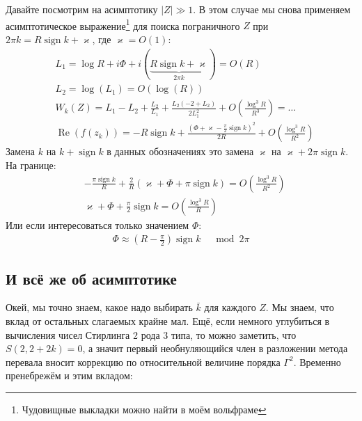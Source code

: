 \documentclass[a4paper, 12pt]{article}
\DeclareMathOperator*{\sign}{sign}
\DeclareMathOperator*{\Real}{Re}
\begin{document}
Давайте посмотрим на асимптотику $|Z|\gg 1$. В этом случае мы снова применяем асимптотическое выражение\footnote{Чудовищные выкладки можно найти в моём вольфраме} для поиска пограничного $Z$ при $2\pi k= R\sign k + \varkappa$, где $\varkappa = O(1)$:
\begin{equation}
\begin{aligned}
    &L_1 = \log R + i \Phi + i\left(\underbrace{R\sign k + \varkappa}_{2\pi k}\right) = O(R)\\
    &L_2 = \log(L_1) = O(\log(R))\\
    &W_k(Z) = L_1 - L_2 + \frac{L_2}{L_1} + \frac{L_2(-2+L_2)}{2L_1^2} + O\left(\frac{\log^3 R}{R^3}\right) = \dots\\
    &\Real(f(z_k)) =  -R\sign k + \frac{\left(\Phi + \varkappa - \frac{\pi}{2}\sign k\right)^2}{2R} +
     O\left(\frac{\log^3 R}{R^2}\right)
\end{aligned}
\end{equation}
Замена $k$ на $k+\sign k$ в данных обозначениях это замена $\varkappa$ на $\varkappa + 2\pi\sign k$. На границе:
\begin{equation}
\begin{aligned}
    &-\frac{\pi\sign k}{R} + \frac{2}{R}
    \left(\varkappa + \Phi + \pi\sign k\right) = O\left(\frac{\log^3 R}{R^2}\right)\\
    &\varkappa + \Phi + \frac{\pi}{2}\sign k= O\left(\frac{\log^3 R}{R}\right)
\end{aligned}
\end{equation}
Или если интересоваться только значением $\Phi$:
\begin{equation}
\begin{aligned}
    \Phi \approx \left(R-\frac{\pi}{2}\right)\sign k \;\;\; \mod 2\pi
\end{aligned}
\end{equation}

\subsection*{И всё же об асимптотике}

Окей, мы точно знаем, какое надо выбирать $\bar k$ для каждого $Z$. Мы знаем, что вклад от остальных слагаемых крайне мал. Ещё, если немного углубиться в вычисления чисел Стирлинга 2 рода 3 типа, то можно заметить, что $S(2, 2+2k)=0$, а значит первый необнуляющийся член в разложении метода перевала вносит коррекцию по относительной величине порядка $\Gamma^2$. Временно пренебрежём и этим вкладом:
\end{document}
